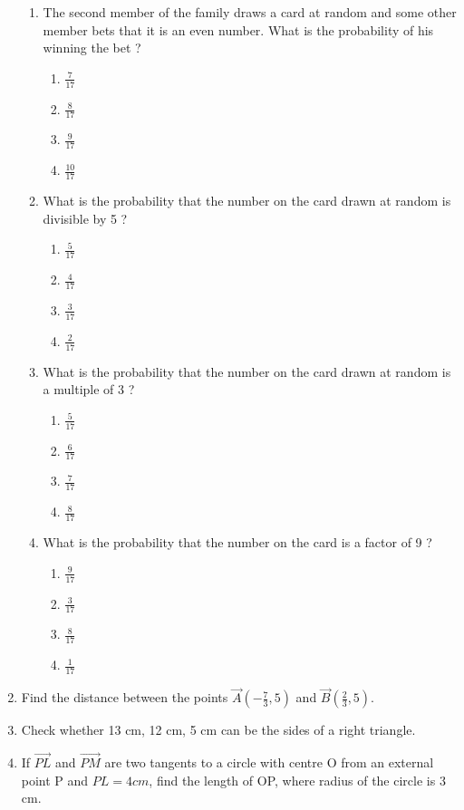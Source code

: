 \documentclass{article}
\begin{document}
\begin{enumerate}
\begin{enumerate}
\item The second member of the family draws a card at random and some other member bets that it is an even number. What is the probability of his winning the bet ? 
	\begin{enumerate}
	\item $\frac{7}{17}$
	\item $\frac{8}{17}$
	\item $\frac{9}{17}$ 
	\item $\frac{10}{17}$ 
	\end{enumerate}
\item What is the probability that the number on the card drawn at random is divisible by 5 ? 
	\begin{enumerate}
	\item $\frac{5}{17}$
	\item $\frac{4}{17}$
	\item $\frac{3}{17}$ 
	\item $\frac{2}{17}$ 
	\end{enumerate}
\item What is the probability that the number on the card drawn at random is a multiple of 3 ? 
	\begin{enumerate}
	\item $\frac{5}{17}$
	\item $\frac{6}{17}$
	\item $\frac{7}{17}$ 
	\item $\frac{8}{17}$ 
	\end{enumerate}
\item What is the probability that the number on the card is a factor of 9 ?
	\begin{enumerate}
	\item $\frac{9}{17}$
	\item $\frac{3}{17}$
	\item $\frac{8}{17}$ 
	\item $\frac{1}{17}$ 
	\end{enumerate}
\end{enumerate}
		
\item Find the distance between the points $ \vec{A} (-\frac{7}{3},5) $ and $ \vec{B} (\frac{2}{3},5) $. 

\item Check whether 13 cm, 12 cm, 5 cm can be the sides of a right triangle.
		
\item If $ \vec{PL} $ and $ \vec{PM} $ are two tangents to a circle with centre O from an external point P and $PL = 4 cm$, find the length of OP, where radius of the circle is 3 cm.
			

\end{enumerate}
\end{document}

